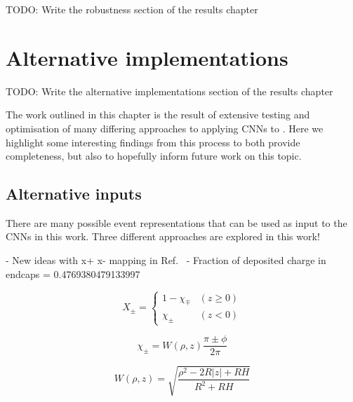 TODO: Write the robustness section of the results chapter

\section{Alternative implementations} %
\label{sec:results_alt} %

TODO: Write the alternative implementations section of the results chapter

The work outlined in this chapter is the result of extensive testing and optimisation of many
differing approaches to applying CNNs to \chips. Here we highlight some interesting findings from
this process to both provide completeness, but also to hopefully inform future work on this topic.

\subsection{Alternative inputs} %
\label{sec:results_alt_inputs} %

There are many possible event representations that can be used as input to the CNNs in this work.
Three different approaches are explored in this work!

- New ideas with x+ x- mapping in Ref.~\cite{berns2020}
- Fraction of deposited charge in endcaps = 0.4769380479133997

\begin{equation} %
    X_{\pm}=
    \begin{cases}
        1-\chi_{\mp} & (z \geq 0) \\
        \chi_{\pm}   & (z < 0)
    \end{cases}
    \label{eq:iso_case}
\end{equation}

\begin{equation} %
    \chi_{\pm}=W(\rho,z)\frac{\pi\pm\phi}{2\pi}
    \label{eq:iso_main}
\end{equation}

\begin{equation} %
    W(\rho,z)=\sqrt{\frac{\rho^{2}-2R|z|+RH}{R^{2}+RH}}
    \label{eq:iso_part}
\end{equation}

